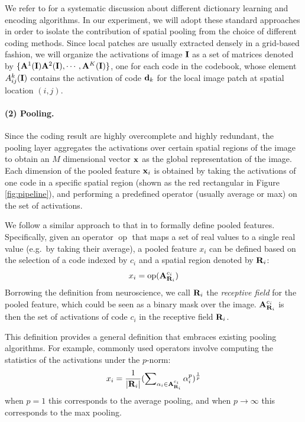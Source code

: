 We refer to \cite{coates2011icml} for a systematic discussion about different dictionary learning and encoding algorithms. In our experiment, we will adopt these standard approaches in order to isolate  the contribution of spatial pooling from the choice of different coding methods. Since local patches are usually extracted densely in a grid-based fashion, we will organize the activations of image $\mathbf{I}$ as a set of matrices denoted by $\{\mathbf{A}^{1}(\mathbf{I})\mathbf{A}^{2}(\mathbf{I}),\cdots,\mathbf{A}^{K}(\mathbf{I})\}$, one for each code in the codebook, whose element $A_{ij}^k(\mathbf{I})$ contains the activation of code $\mathbf{d}_k$ for the local image patch at spatial location $(i,j)$. 

\paragraph{(2) Pooling.} Since the coding result are highly overcomplete and highly redundant, the pooling layer aggregates the activations over certain spatial regions of the image to obtain an $M$ dimensional vector $\mathbf{x}$ as the global representation of the image. Each dimension of the pooled feature $\mathbf{x}_i$ is obtained by taking the activations of one code in a specific spatial region (shown as the red rectangular in Figure \ref{fig:pipeline}), and performing a predefined operator (usually average or max) on the set of activations. 

We follow a similar approach to that in \cite{Boureau:2011tz} to formally define pooled features. Specifically, given an operator $\operatorname{op}$ that maps a set of real values to a single real value (e.g.\ by taking their average), a pooled feature $x_i$ can be defined based on the selection of a code indexed by $c_i$ and a spatial region denoted by $\mathbf{R}_{i}$:
\begin{equation}
  x_i = \operatorname{op} (\mathbf{A}^{c_i}_{\mathbf{R}_{i}})
\end{equation}
Borrowing the definition from neuroscience, we call $\mathbf{R}_i$ the \emph{receptive field} for the pooled feature, which could be seen as a binary mask over the image. $\mathbf{A}^{c_i}_{\mathbf{R}_{i}}$ is then the set of activations of code $c_i$ in the receptive field $\mathbf{R}_i$.

This definition provides a general definition that embraces existing pooling algorithms. For example, commonly used operators involve computing the statistics of the activations under the $p$-norm:
\begin{equation}
  x_i = \frac{1}{|\mathbf{R}_{i}|}(\sum\nolimits_{\alpha_i \in \mathbf{A}^{c_i}_{\mathbf{R}_{i}}} \alpha_i^{p})^{\frac{1}{p}}
\end{equation}
when $p=1$ this corresponds to the average pooling, and when $p\rightarrow \infty$ this corresponds to the max pooling.

